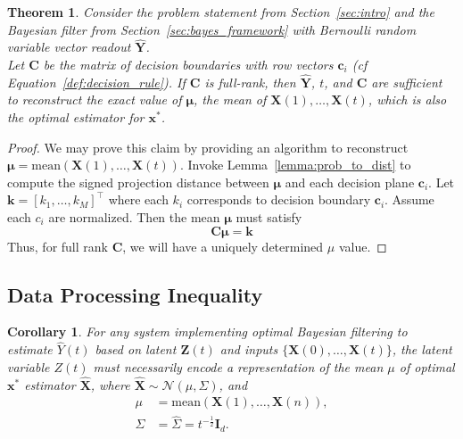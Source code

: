 \documentclass[12pt]{article}
\newtheorem{theorem}{Theorem}
\newtheorem{corollary}{Corollary}
\begin{document}
\begin{theorem}
	\label{thm:main}
	Consider the problem statement from Section~\ref{sec:intro} and the Bayesian filter from Section~\ref{sec:bayes_framework} with Bernoulli random variable vector readout $\hat{\mathbf Y}$. \\
	
	Let $\mathbf C$ be the matrix of decision boundaries with row vectors $\mathbf c_i$ (cf Equation~\ref{def:decision_rule}). 
	If $\mathbf C$ is full-rank, then $\hat{\mathbf Y}$, $t$, and $\mathbf C$ are sufficient to reconstruct the exact value of $\mathbf \mu$, the mean of $\mathbf X(1), \dots, \mathbf X(t)$, which is also the optimal estimator for $\mathbf x^*$. 
\end{theorem}
\begin{proof}
	We may prove this claim by providing an algorithm to reconstruct $\mathbf \mu = \text{mean}(\mathbf X(1), \dots, \mathbf X(t))$.
	Invoke Lemma~\ref{lemma:prob_to_dist} to compute the signed projection distance between $\mathbf \mu$ and each decision plane $\mathbf c_i$.
	Let $\mathbf k = [k_1, \dots, k_M]^\top$ where each $k_i$ corresponds to decision boundary $\mathbf c_i$.
	Assume each $c_i$ are normalized. Then the mean $\mathbf \mu$ must satisfy 
	\begin{equation}
		\label{eqn:final_lin_sys}
		\mathbf {C \mu} = \mathbf k
	\end{equation}
	Thus, for full rank $\mathbf C$, we will have a uniquely determined $\mu$ value. 
\end{proof}


\subsection{Data Processing Inequality}


\begin{corollary}
	For any system implementing optimal Bayesian filtering to estimate $\hat Y(t)$ based on latent $\mathbf Z(t)$ and inputs $\{\mathbf X(0), \dots, \mathbf X(t)\}$, the latent variable $Z(t)$ must necessarily encode a representation of the mean $\mu$ of optimal $\mathbf x^*$ estimator $\hat{\mathbf X}$, where $\hat{\mathbf X} \sim \mathcal{N}(\mu, \Sigma)$, and
	\begin{align*}
		\mu &= \text{mean}\left(\mathbf X(1), \dots, \mathbf X(n)\right), \\
		\Sigma &= \hat{\Sigma} = t^{-\frac{1}{2}} \mathbf{I}_d.
	\end{align*}
\end{corollary}
\end{document}
